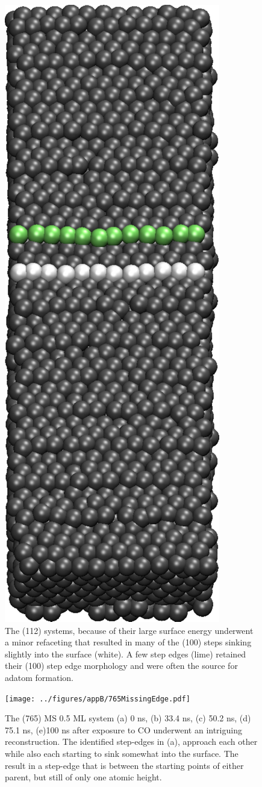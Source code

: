 \begin{figure}
\includegraphics[width=0.4\linewidth]{../figures/appB/112_sunken.pdf}
\caption{The (112) systems, because of their large surface energy underwent a
minor refaceting that resulted in many of the (100) steps sinking slightly into
the surface (white). A few step edges (lime) retained their (100) step edge
morphology and were often the source for adatom formation.}
\label{fig:112sunken}
\end{figure}
\newpage









\begin{figure}
\texttt{[image: ../figures/appB/765MissingEdge.pdf]}
\caption{The (765) MS 0.5 ML system (a) 0 ns, (b) 33.4 ns, (c) 50.2 ns, (d)
75.1 ns, (e)100 ns after exposure to CO underwent an intriguing reconstruction.
The identified step-edges in (a), approach each other while also each starting
to sink somewhat into the surface. The result in a step-edge that is between
the starting points of either parent, but still of only one atomic height.}
\label{fig:765Edge}
\end{figure}
\newpage

